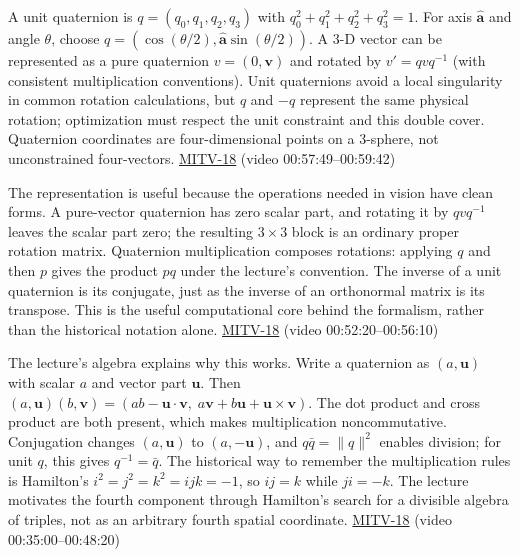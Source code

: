A unit quaternion is \(q=(q_0,q_1,q_2,q_3)\) with \(q_0^2+q_1^2+q_2^2+q_3^2=1\). For axis \(\hat{\mathbf{a}}\) and angle \(\theta\), choose \(q=(\cos(\theta/2),\hat{\mathbf{a}}\sin(\theta/2))\). A 3-D vector can be represented as a pure quaternion \(v=(0,\mathbf{v})\) and rotated by \(v'=qv q^{-1}\) (with consistent multiplication conventions). Unit quaternions avoid a local singularity in common rotation calculations, but \(q\) and \(-q\) represent the same physical rotation; optimization must respect the unit constraint and this double cover. Quaternion coordinates are four-dimensional points on a 3-sphere, not unconstrained four-vectors. \hyperref[04-visual-computing-ii-ch036-mitv-18---rotation-and-how-to-represent-it-unit-quaternions-the-space-of-rotations]{MITV-18} (video 00:57:49--00:59:42)

The representation is useful because the operations needed in vision have clean forms. A pure-vector quaternion has zero scalar part, and rotating it by \(qvq^{-1}\) leaves the scalar part zero; the resulting \(3\times3\) block is an ordinary proper rotation matrix. Quaternion multiplication composes rotations: applying \(q\) and then \(p\) gives the product \(pq\) under the lecture's convention. The inverse of a unit quaternion is its conjugate, just as the inverse of an orthonormal matrix is its transpose. This is the useful computational core behind the formalism, rather than the historical notation alone. \hyperref[04-visual-computing-ii-ch036-mitv-18---rotation-and-how-to-represent-it-unit-quaternions-the-space-of-rotations]{MITV-18} (video 00:52:20--00:56:10)

The lecture's algebra explains why this works. Write a quaternion as \((a,\mathbf{u})\) with scalar \(a\) and vector part \(\mathbf{u}\). Then \((a,\mathbf{u})(b,\mathbf{v})=(ab-\mathbf{u}\cdot\mathbf{v},\;a\mathbf{v}+b\mathbf{u}+\mathbf{u}\times\mathbf{v})\). The dot product and cross product are both present, which makes multiplication noncommutative. Conjugation changes \((a,\mathbf{u})\) to \((a,-\mathbf{u})\), and \(q\bar q=\|q\|^2\) enables division; for unit \(q\), this gives \(q^{-1}=\bar q\). The historical way to remember the multiplication rules is Hamilton's \(i^2=j^2=k^2=ijk=-1\), so \(ij=k\) while \(ji=-k\). The lecture motivates the fourth component through Hamilton's search for a divisible algebra of triples, not as an arbitrary fourth spatial coordinate. \hyperref[04-visual-computing-ii-ch036-mitv-18---rotation-and-how-to-represent-it-unit-quaternions-the-space-of-rotations]{MITV-18} (video 00:35:00--00:48:20)

